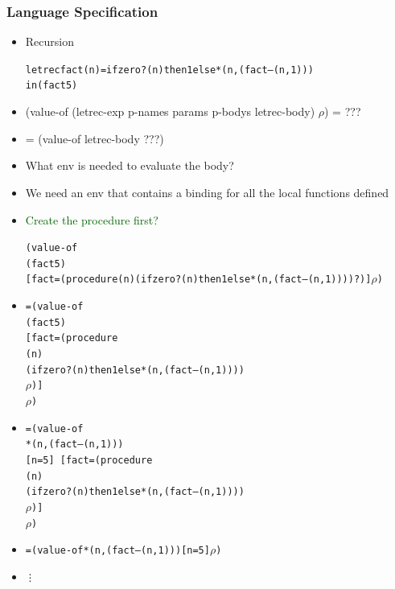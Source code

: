 \documentclass{beamer}
\newcommand{\quot}{\texttt{\textquotesingle{}}}
\begin{document}
\begin{frame}[fragile]
\frametitle{Language Specification}
\begin{tiny}
\begin{itemize}
\item<1-> Recursion
\begin{alltt}
letrec fact(n) = if zero?(n) then 1 else *(n, (fact –(n, 1)))
in (fact 5)
\end{alltt}

\item<1-> (value-of (letrec-exp p-names params p-bodys letrec-body) $\rho$) = ???

\item<2-> = (value-of letrec-body ???)

\item<2-> What env is needed to evaluate the body?

\item<3-> We need an env that contains a binding for all the local functions defined

\item<4-> \textcolor{darkgreen}{Create the procedure first?}
\begin{alltt}
(value-of
 (fact 5)
 \texttt{[}fact=(procedure \quot{}(n) (if zero?(n) then 1 else *(n, (fact –(n, 1)))) ?)\texttt{]} \(\rho\))
\end{alltt}

\item<5->
\begin{alltt}
= (value-of
   (fact 5)
   [fact=(procedure
           \quot{}(n)
           (if zero?(n) then 1 else *(n, (fact –(n, 1))))
           \(\rho\))]
   \(\rho\))
\end{alltt}

\item<6->
\begin{alltt}
= (value-of
   *(n, (fact –(n, 1)))
   \texttt{[}n=5\texttt{]
   [}fact=(procedure
            \quot{}(n)
            (if zero?(n) then 1 else *(n, (fact –(n, 1))))
            \(\rho\))\texttt{]}
   \(\rho\))
\end{alltt}

\item<7->
\begin{alltt}
= (value-of *(n, (fact –(n, 1))) \texttt{[}n=5\texttt{]}\(\rho\))
\end{alltt}

\item<8->
\begin{alltt}
          \vdots
\end{alltt}


\end{itemize}
\end{tiny}
\end{frame}
\end{document}
